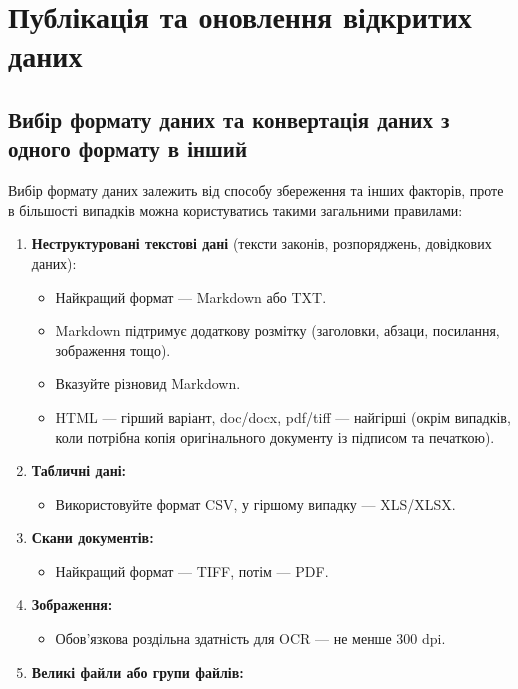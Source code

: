 \chapter{Публікація та оновлення відкритих даних}

\section{Вибір формату даних та конвертація даних з одного формату в інший}

Вибір формату даних залежить від способу збереження та інших факторів, проте в більшості випадків можна користуватись такими загальними правилами:

\begin{enumerate}
    \item \textbf{Неструктуровані текстові дані} (тексти законів, розпоряджень, довідкових даних):  
        \begin{itemize}
            \item Найкращий формат — Markdown або TXT.  
            \item Markdown підтримує додаткову розмітку (заголовки, абзаци, посилання, зображення тощо).  
            \item Вказуйте різновид Markdown.  
            \item HTML — гірший варіант, doc/docx, pdf/tiff — найгірші (окрім випадків, коли потрібна копія оригінального документу із підписом та печаткою).
        \end{itemize}
    \item \textbf{Табличні дані:}  
        \begin{itemize}
            \item Використовуйте формат CSV, у гіршому випадку — XLS/XLSX.
        \end{itemize}
    \item \textbf{Скани документів:}  
        \begin{itemize}
            \item Найкращий формат — TIFF, потім — PDF.
        \end{itemize}
    \item \textbf{Зображення:}  
        \begin{itemize}
            \item Обов'язкова роздільна здатність для OCR — не менше 300 dpi.
        \end{itemize}
    \item \textbf{Великі файли або групи файлів:}  
        \begin{itemize}

\end{itemize}
\end{enumerate}
